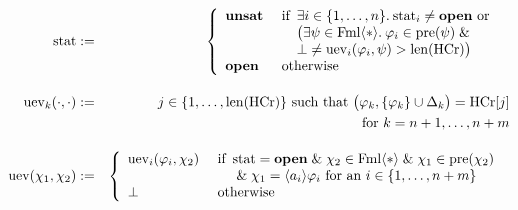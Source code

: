 \documentclass{entcs}
\newcommand{\xand}{\;\&\;}
\newcommand{\xor}{\text{ or }}
\newcommand{\pea}[2]{\langle#1\rangle #2}
\newcommand{\prp}[1]{#1*}
\newcommand{\fmler}{\mathrm{Fml}\pea{\prp{}}{}}
\newcommand{\ppre}[1]{\mathrm{pre}(#1)}
\newcommand{\thc}{\mathrm{HCr}}
\newcommand{\tmrk}{\mathrm{stat}}
\newcommand{\tuev}{\mathrm{uev}}
\newcommand{\ttrue}{\mathbf{unsat}}
\newcommand{\tfalse}{\mathbf{open}}
\newcommand{\llen}{\mathop{\mathrm{len}}}
\begin{document}
\begin{eqnarray*}
  \tmrk & := &
  \left\{
    \begin{array}{ll}
      \ttrue & \text{ if}
      \begin{array}[t]{l}
        \exists i \in \{1, \dotsc , n\}.\: \tmrk_i \not= \tfalse \xor\\
        \big( \exists \psi \in \fmler.\: \varphi_i \in \ppre{\psi} \xand\\
        \bot \neq \tuev_i(\varphi_i, \psi) > \llen(\thc) \big)
      \end{array}\\
      \tfalse & \text{ otherwise }
    \end{array}
  \right .
  \\[1em]
  \tuev_k(\cdot, \cdot) & := & j \in \{1, \dotsc, \llen(\thc)\}
  \text{ such that } \big( \varphi_k, \{ \varphi_k \} \cup \Delta_k \big) = \thc[j] \\
  & & \text{for } k = n+1, \dotsc ,n+m
  \\[1em]
  \tuev(\chi_1, \chi_2) & := &
  \left\{
    \begin{array}{ll}
      \tuev_i(\varphi_i, \chi_2) & \text{ if}
      \begin{array}[t]{l}
        \tmrk = \tfalse \xand \chi_2 \in \fmler \xand \chi_1 \in \ppre{\chi_2}\\
        \xand \chi_1 = \pea{a_i}{\varphi_i} \text{ for an } i \in \{ 1, \dotsc , n+m \}\\
      \end{array}\\
      \bot & \text{ otherwise }
    \end{array}
  \right .
\end{eqnarray*}
\end{document}
